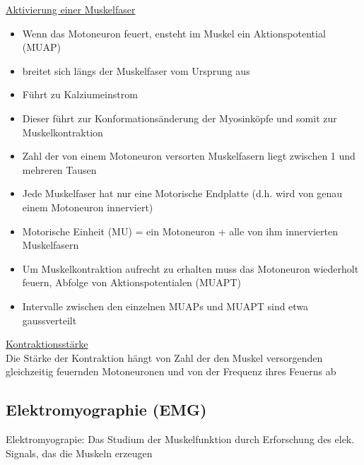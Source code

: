 \documentclass[a4paper,10pt,oneside]{article}
\begin{document}
\underline{Aktivierung einer Muskelfaser} \\
	\begin{itemize}
		\item Wenn das Motoneuron feuert, ensteht im Muskel ein Aktionspotential (MUAP)
		\item breitet sich längs der Muskelfaser vom Ursprung aus
		\item Führt zu Kalziumeinstrom
		\item Dieser führt zur Konformationsänderung der Myosinköpfe und somit zur Muskelkontraktion
		\item Zahl der von einem Motoneuron versorten Muskelfasern liegt zwischen 1 und mehreren Tausen
		\item Jede Muskelfaser hat nur eine Motorische Endplatte (d.h. wird von genau einem Motoneuron innerviert)
		\item Motorische Einheit (MU) = ein Motoneuron + alle von ihm innervierten Muskelfasern
		\item Um Muskelkontraktion aufrecht zu erhalten muss das Motoneuron wiederholt feuern, Abfolge von Aktionspotentialen (MUAPT)
		\item Intervalle zwischen den einzelnen MUAPs und MUAPT sind etwa gaussverteilt
	\end{itemize}
	
\underline{Kontraktionsstärke} \\
Die Stärke der Kontraktion hängt von Zahl der den Muskel versorgenden gleichzeitig feuernden Motoneuronen und von der Frequenz ihres Feuerns ab

\subsection{Elektromyographie (EMG)}
Elektromyograpie: Das Studium der Muskelfunktion durch Erforschung des elek. Signals, das die Muskeln erzeugen
\end{document}
